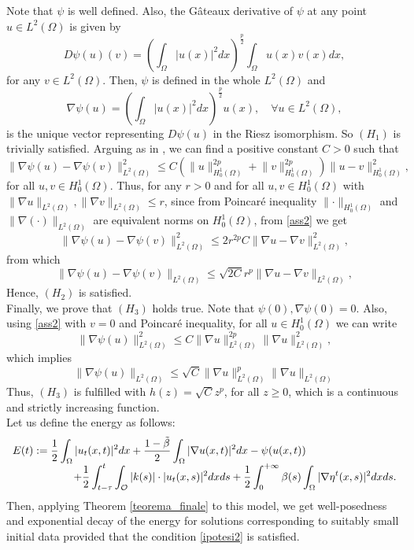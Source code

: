\documentclass[11pt]{article}
\renewcommand{\geq}{\geqslant}
\renewcommand{\leq}{\leqslant}
\begin{document}
Note that $\psi$ is well defined. Also, the G\^ateaux derivative of $\psi$ at any point $u\in L^2(\Omega)$ is given by
$$D\psi(u)(v)= \left(\int_{\Omega} |u(x)|^{2}dx\right)^{\frac{p}{2}}\int_{\Omega}u(x)v(x)dx,$$
for any $v\in L^2(\Omega)$. Then, $\psi$ is defined in the whole $L^2(\Omega)$ and 
$$\nabla\psi(u)=\left(\int_{\Omega} |u(x)|^{2}dx\right)^{\frac{p}{2}}u(x),\quad \forall u\in L^2(\Omega),$$
is the unique vector representing $D\psi(u)$ in the Riesz isomorphism. So $(H_1)$ is trivially satisfied.
Arguing as in \cite{LuoXiao}, we can find a positive constant $C>0$ such that
\begin{equation}\label{ass2}
	\lVert \nabla\psi(u)-\nabla\psi(v)\rVert^2_{L^2(\Omega)}\leq C(\lVert u\rVert^{2p}_{H^1_0(\Omega)}+\lVert v\rVert^{2p}_{H^1_0(\Omega)})\lVert u-v\rVert^2_{H^1_0(\Omega)},
\end{equation}
for all $u,v\in H^1_0(\Omega).$ Thus, for any $r> 0$ and for all $u,v\in H^1_0(\Omega)$ with $\lVert \nabla u\rVert_{L^2(\Omega)},\lVert \nabla v\rVert_{L^2(\Omega)}\leq r$, since from Poincaré inequality $\lVert\cdot\rVert_{H^1_0(\Omega)}$ and $\lVert \nabla (\cdot)\rVert_{L^2(\Omega)}$ are equivalent norms on $H^1_0(\Omega)$, from \eqref{ass2} we get
$$\lVert \nabla\psi(u)-\nabla\psi(v)\rVert^2_{L^2(\Omega)}\leq 2r^{2p}C\lVert \nabla u-\nabla v\rVert^2_{L^2(\Omega)},$$
from which
$$\lVert \nabla\psi(u)-\nabla\psi(v)\rVert_{L^2(\Omega)}\leq \sqrt{2C}r^{p}\lVert \nabla u-\nabla v\rVert_{L^2(\Omega)},$$
Hence, $(H_2)$ is satisfied. 
\\Finally, we prove that $(H_3)$ holds true. Note that $\psi(0),\nabla\psi(0)=0$. Also, using \eqref{ass2} with $v=0$ and Poincaré inequality, for all $u\in H^1_0(\Omega)$ we can write
$$\lVert \nabla\psi(u)\rVert^2_{L^2(\Omega)}\leq C\lVert \nabla u\rVert^{2p}_{L^2(\Omega)}\lVert \nabla u\rVert^2_{L^2(\Omega)},$$
which implies
$$\lVert \nabla\psi(u)\rVert_{L^2(\Omega)}\leq \sqrt{C}\lVert \nabla u\rVert^{p}_{L^2(\Omega)}\lVert \nabla u\rVert_{L^2(\Omega)}$$
Thus, $(H_3)$ is fulfilled with $h(z)=\sqrt{C}z^{p}$, for all $z\geq 0$, which is a continuous and strictly increasing function.
\\Let us define the energy as follows:
$$
\begin{array}{l}
	\displaystyle{E(t):= \frac{1}{2}\int_{\Omega} |u_t(x,t)|^2 dx +\frac{1-\tilde{\beta}}{2}\int_{\Omega} |\nabla u(x,t)|^2 dx -\psi(u(x,t))}\\
	\hspace{2 cm}
	\displaystyle{ +\frac{1}{2}\int_{t-\tau}^t \int_{\mathcal{O}} |k(s)|\cdot |u_t(x,s)|^2 dx ds +\frac{1}{2}\int_0^{+\infty} \beta (s)\int_{\Omega} |\nabla \eta^t(x,s)|^2 dx ds.}
\end{array}
$$
Then, applying Theorem \ref{teorema_finale} to this model, we get well-posedness and exponential decay of the energy for solutions corresponding to suitably small initial data provided that the condition \eqref{ipotesi2} is satisfied.
\end{document}
